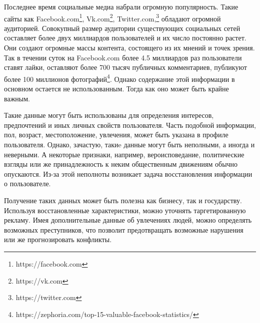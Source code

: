 \documentclass[annotation,times,page4]{itmo-student-thesis}
\begin{document}

\makemastertitle

\tableofcontents

\startprefacepage

Последнее время социальные медиа набрали огромную популярность. Такие сайты как Facebook.com\footnote{https://facebook.com}, Vk.com\footnote{https://vk.com}, Twitter.com,\footnote{https://twitter.com} обладают огромной аудиторией. Совокупный размер аудитории существующих социальных сетей составляет более двух миллиардов пользователей и их число постоянно растет. Они создают огромные массы контента, состоящего из их мнений и точек зрения. Так в течении суток на Facebook.com более 4.5 миллиардов раз пользователи ставят лайки, оставляют более 700 тысяч публичных комментариев, публикуют более 100 миллионов фотографий\footnote{https://zephoria.com/top-15-valuable-facebook-statistics/}. Однако содержание этой информации в основном остается не использованным. Тогда как оно может быть крайне важным.

Такие данные могут быть использованы для определения интересов, предпочтений и иных личных свойств пользователя. Часть подобной информации, пол, возраст,  местоположение, увлечения, может быть указана в профиле пользователя. Однако, зачастую, такиe данные могут быть неполными, а иногда и неверными. А некоторые признаки, например, вероисповедание, политические взгляды или же принадлежность к неким общественным движениям обычно опускаются. Из-за этой неполноты возникает задача восстановления информации о пользователе.

Получение таких данных может быть полезна как бизнесу, так и государству\cite{ramakrishnan2014beating}. Используя восстановленные характеристики, можно уточнять таргетированную рекламу\cite{swearingen2001beyond}. Имея дополнительные данные об увлечениях людей, можно определять возможных преступников, что позволит предотвращать возможные нарушения или же прогнозировать конфликты\cite{grothoff2016nsa}.
\end{document}
